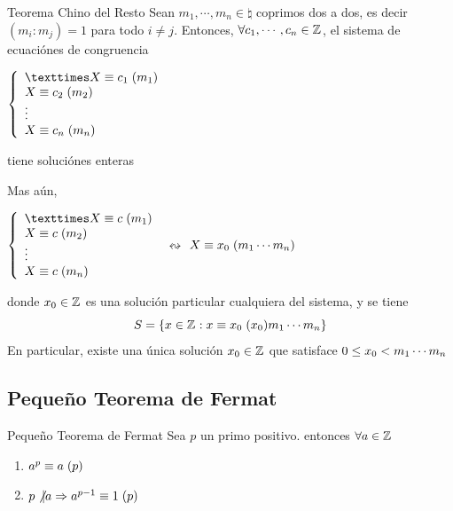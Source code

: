\documentclass[10pt]{article}
\begin{document}
\begin{teo}{Teorema Chino del Resto}
   Sean $m_1, \cdots , m_n \in \natural{}$ coprimos dos a dos, es decir $(m_i : m_j)=1$ para todo $i \neq j$. Entonces, $\forall c_1, \cdots, c_n \in \mathbb{Z}^{}$, el sistema de ecuaciónes de congruencia
\begin{center}
  $\left\lbrace \begin{array}{l}
                × \congruente{X}{c_1}{m_1} \\
                  \congruente{X}{c_2}{m_2} \\
                  \vdots              \\
                  \congruente{X}{c_n}{m_n}
               \end{array}\right.$ 
  \end{center}
  tiene soluciónes enteras
  
  Mas aún, 
  \begin{center}
  $\left\lbrace \begin{array}{l}
                × \congruente{X}{c}{m_1} \\
                  \congruente{X}{c}{m_2} \\
                  \vdots              \\
                  \congruente{X}{c}{m_n}
               \end{array}\right.$ $\leftrightsquigarrow$ $X \equiv x_0 \hspace{0.1cm} (m_1 \cdots m_n)$
  \end{center}
  donde $x_0 \in \mathbb{Z}^{}$ es una solución particular cualquiera del sistema, y se tiene
  \[S = \{x \in \mathbb{Z}^{} : x \equiv x_0 \hspace{0.1cm} (x_0){m_1 \cdots m_n}\}\]
  En particular, existe una única solución $x_0 \in \mathbb{Z}^{}$ que satisface $0 \leq x_0 < m_1 \cdots m_n$
\end{teo}


\begin{center}
\subsection{Pequeño Teorema de Fermat} 
\end{center}

\begin{teo}{Pequeño Teorema de Fermat}
 Sea $p$ un primo positivo. entonces $\forall a \in \mathbb{Z}^{}$
 \begin{enumerate}
  \item $a^p \equiv a \hspace{0.1cm} (p)$
  \item $p \not\vert a \Rightarrow a^{p-1} \equiv 1 \hspace{0.1cm} (p)$
 \end{enumerate}
\end{teo}
\end{document}
